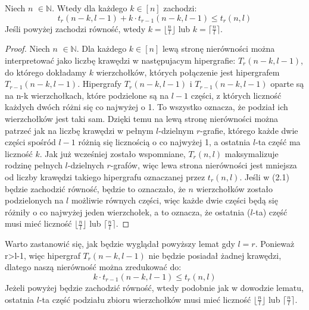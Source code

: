 \documentclass[miz,woman]{mgrwms}
\begin{document}
\begin{lem} \label{lemat}
 Niech $n$ $\in \mathbb{N}$. Wtedy dla każdego $k \in [n]$ zachodzi:
\begin{equation}
t_r(n-k,l-1)+k \cdot t_{r-1}(n-k,l-1)\leq t_r(n,l) \label{nierownosc}
\end{equation}
Jeśli powyżej zachodzi równość, wtedy $k=\lfloor \frac{n}{l} \rfloor$ lub $k=\lceil \frac{n}{l} \rceil$.
\end{lem}
\begin{proof}
Niech $n$ $\in \mathbb{N}$. Dla każdego $k \in [n]$ lewą stronę nierówności można interpretować jako liczbę krawędzi w
następujacym hipergrafie: $T_r(n-k,l-1)$, do którego dokładamy $k$ wierzchołków, których połączenie jest hipergrafem
$T_{r-1}(n-k,l-1)$. Hipergrafy $T_r(n-k,l-1)$ i $T_{r-1}(n-k,l-1)$ oparte są na n-k wierzchołkach, które podzielone są
na $l-1$ części, z których liczność każdych dwóch różni się co najwyżej o 1. To wszystko oznacza, że  podział ich wierzchołków jest
taki sam. Dzięki temu na lewą stronę nierówności można patrzeć jak na liczbę krawędzi w pełnym $l$-dzielnym $r$-grafie, 
którego każde dwie części spośród $l-1$ różnią się licznością o co najwyżej 1, a ostatnia $l$-ta część ma liczność $k$.
Jak już wcześniej zostało wspomniane, $T_r(n,l)$ maksymalizuje rodzinę pełnych $l$-dzielnych $r$-grafów, więc lewa strona
nierówności jest mniejsza od liczby krawędzi takiego hipergrafu oznaczanej przez $t_r(n,l)$. Jeśli w (2.1) będzie zachodzić
równość, będzie to oznaczało, że $n$ wierzchołków zostało podzielonych na $l$ możliwie równych części, więc każde dwie części
będą się różniły o co najwyżej jeden wierzchołek, a to oznacza, że ostatnia ($l$-ta) część musi mieć liczność 
$\lfloor \frac{n}{l} \rfloor$ lub $\lceil \frac{n}{l} \rceil$.
\end{proof}
Warto zastanowić się, jak będzie wyglądał powyższy lemat gdy $l=r$. Ponieważ r>l-1, więc hipergraf $T_r(n-k,l-1)$ nie
będzie posiadał żadnej krawędzi, dlatego naszą nierówność można zredukować do:
\begin{equation}
k \cdot t_{r-1}(n-k,l-1)\leq t_r(n,l)
\end{equation}
Jeżeli powyżej będzie zachodzić równość, wtedy podobnie jak w dowodzie lematu, ostatnia $l$-ta część podziału zbioru wierzchołków
musi mieć liczność $\lfloor \frac{n}{l} \rfloor$ lub $\lceil \frac{n}{l} \rceil$.
\end{document}
